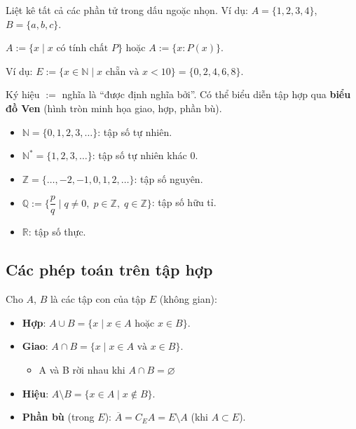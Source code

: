 \documentclass[12pt,a4paper]{article}
\begin{document}
\begin{phuongphap}[title={Liệt kê}]
  Liệt kê tất cả các phần tử trong dấu ngoặc nhọn. Ví dụ: $A = \{1, 2, 3, 4\}$, $B = \{a, b, c\}$.
\end{phuongphap}

\begin{phuongphap}[title={Chỉ ra tính chất đặc trưng}]
  $A := \{x \mid x \text{ có tính chất } P\}$ hoặc $A := \{x : P(x)\}$.
  
  Ví dụ: $E := \{x \in \mathbb{N} \mid x \text{ chẵn và } x < 10\} = \{0, 2, 4, 6, 8\}$.
\end{phuongphap}

\begin{luuy}
  Ký hiệu $:=$ nghĩa là ``được định nghĩa bởi''. Có thể biểu diễn tập hợp qua \textbf{biểu đồ Ven} (hình tròn minh họa giao, hợp, phần bù).
\end{luuy}

\begin{vidu}
  \begin{itemize}
    \item $\mathbb{N} = \{0, 1, 2, 3, \ldots\}$: tập số tự nhiên.
    \item $\mathbb{N}^* = \{1, 2, 3, \ldots\}$: tập số tự nhiên khác $0$.
    \item $\mathbb{Z} = \{\ldots, -2, -1, 0, 1, 2, \ldots\}$: tập số nguyên.
    \item $\mathbb{Q} := \{\dfrac{p}{q} \mid q \ne 0,\; p \in \mathbb{Z},\; q \in \mathbb{Z}\}$: tập số hữu tỉ.
    \item $\mathbb{R}$: tập số thực.
  \end{itemize}
\end{vidu}

\subsection{Các phép toán trên tập hợp}

\begin{dinhnghia}
  Cho $A$, $B$ là các tập con của tập $E$ (không gian):
  \begin{itemize}
    \item \textbf{Hợp}: $A \cup B = \{x \mid x \in A \text{ hoặc } x \in B\}$.
    \item \textbf{Giao}: $A \cap B = \{x \mid x \in A \text{ và } x \in B\}$.
    \begin{itemize}
        \item A và B rời nhau khi $A \cap B = \varnothing$
    \end{itemize}
    \item \textbf{Hiệu}: $A \setminus B = \{x \in A \mid x \notin B\}$.
    \item \textbf{Phần bù} (trong $E$): $\overline{A} = C_E A = E \setminus A$ (khi $A \subset E$).
  \end{itemize}
\end{dinhnghia}
\end{document}
